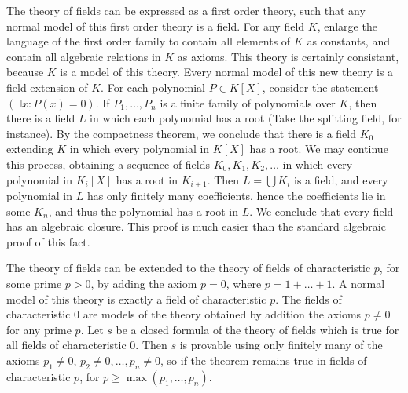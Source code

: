 \begin{example}
    The theory of fields can be expressed as a first order theory, such that any normal model of this first order theory is a field. For any field $K$, enlarge the language of the first order family to contain all elements of $K$ as constants, and contain all algebraic relations in $K$ as axioms. This theory is certainly consistant, because $K$ is a model of this theory. Every normal model of this new theory is a field extension of $K$. For each polynomial $P \in K[X]$, consider the statement $(\exists x: P(x) = 0)$. If $P_1, \dots, P_n$ is a finite family of polynomials over $K$, then there is a field $L$ in which each polynomial has a root (Take the splitting field, for instance). By the compactness theorem, we conclude that there is a field $K_0$ extending $K$ in which every polynomial in $K[X]$ has a root. We may continue this process, obtaining a sequence of fields $K_0, K_1, K_2, \dots$ in which every polynomial in $K_i[X]$ has a root in $K_{i+1}$. Then $L = \bigcup K_i$ is a field, and every polynomial in $L$ has only finitely many coefficients, hence the coefficients lie in some $K_n$, and thus the polynomial has a root in $L$. We conclude that every field has an algebraic closure. This proof is much easier than the standard algebraic proof of this fact.
\end{example}

\begin{example}
    The theory of fields can be extended to the theory of fields of characteristic $p$, for some prime $p > 0$, by adding the axiom $p = 0$, where $p = 1 + \dots + 1$. A normal model of this theory is exactly a field of characteristic $p$. The fields of characteristic 0 are models of the theory obtained by addition the axioms $p \neq 0$ for any prime $p$. Let $s$ be a closed formula of the theory of fields which is true for all fields of characteristic 0. Then $s$ is provable using only finitely many of the axioms $p_1 \neq 0$, $p_2 \neq 0, \dots, p_n \neq 0$, so if the theorem remains true in fields of characteristic $p$, for $p \geq \max(p_1, \dots, p_n)$.
\end{example}

